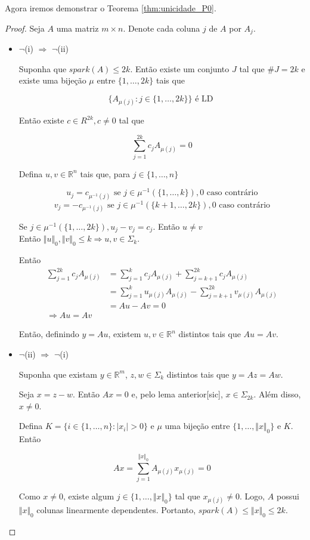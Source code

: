 Agora iremos demonstrar o Teorema \ref{thm:unicidade_P0}.
\begin{proof}
Seja $A$ uma matriz $m \times n$. Denote cada coluna $j$ de $A$ por $A_j$.
\begin{itemize}
\item $\neg$(i) $\Rightarrow$ $\neg$(ii)

Suponha que $\textit{spark}(A) \leq 2k$. Então existe um conjunto $J$ tal que $\#J = 2k$ e existe uma bijeção $\mu$ entre $\lbrace 1, \hdots, 2k \rbrace$ tais que

$$ \lbrace A_{\mu(j)} : j \in \lbrace 1, \hdots, 2k \rbrace \rbrace \text{ é LD }$$

Então existe $c \in R^{2k}, c \neq 0$ tal que

$$ \sum_{j = 1}^{2k} c_j A_{\mu(j)} = 0$$

Defina $u, v \in \mathbb{R}^n$ tais que, para $j \in \lbrace 1, \hdots, n \rbrace$

$$u_j = c_{\mu^{-1}(j)} \text{ se } j \in \mu^{-1}(\lbrace 1, \hdots, k \rbrace), 0 \text{ caso contrário}$$
$$v_j = -c_{\mu^{-1}(j)} \text{ se } j \in \mu^{-1}(\lbrace k+1, \hdots, 2k \rbrace), 0 \text{ caso contrário}$$

Se $j \in \mu^{-1}(\lbrace 1, \hdots, 2k \rbrace), u_j - v_j = c_j$. Então $u \neq v$\\
Então $\Vert u \Vert_0, \Vert v \Vert_0 \leq k \Rightarrow u, v \in \Sigma_k$.

Então
\begin{subequations}
\begin{align*}
\sum_{j = 1}^{2k} c_j A_{\mu(j)} &= \sum_{j = 1}^{k} c_j A_{\mu(j)} + \sum_{j = k+1}^{2k} c_j A_{\mu(j)}\\
& = \sum_{j = 1}^{k} u_{\mu(j)} A_{\mu(j)} - \sum_{j = k+1}^{2k} v_{\mu(j)} A_{\mu(j)} \\
& = Au - Av = 0 \\
 \Rightarrow Au = Av
\end{align*}
\end{subequations}

Então, definindo $y = Au$, existem $u, v \in \mathbb{R}^n$ distintos tais que $Au = Av$.
\item $\neg$(ii) $\Rightarrow$ $\neg$(i)

Suponha que existam $y \in \mathbb{R}^m$, $z, w \in \Sigma_k$ distintos tais que $y = Az = Aw$.

Seja $x = z - w$. Então $Ax = 0$ e, pelo lema anterior[sic], $x \in \Sigma_{2k}$. Além disso, $x \neq 0$.

Defina $K = \lbrace i \in \lbrace 1, \hdots, n \rbrace: \vert x_i \vert > 0 \rbrace$ e $\mu$ uma bijeção entre $\lbrace 1, \hdots, \Vert x \Vert_0 \rbrace$ e $K$. Então

$$ Ax = \sum_{j = 1}^{\Vert x \Vert_0} A_{\mu(j)} x_{\mu(j)} = 0$$

Como $x \neq 0$, existe algum $j \in \lbrace 1, \hdots, \Vert x \Vert_0 \rbrace$ tal que $x_{\mu(j)} \neq 0$. Logo, $A$ possui $\Vert x \Vert_0$ colunas linearmente dependentes. Portanto, $\textit{spark}(A) \leq \Vert x \Vert_0 \leq 2k$.
\end{itemize}
\end{proof}
